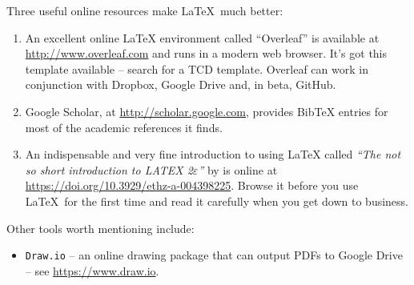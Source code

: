 Three useful online resources make \LaTeX~much better:
\begin{enumerate}[(1)]
\item An excellent online \LaTeX{} environment called ``Overleaf'' is available at \url{http://www.overleaf.com} and runs in a modern web browser. It's got this template available -- search for a TCD template. Overleaf can work in conjunction with Dropbox, Google Drive and, in beta, GitHub.
\item Google Scholar, at \url{http://scholar.google.com}, provides BibTeX entries for most of the academic references it finds.
\item An indispensable and very fine introduction to using \LaTeX{} called \emph{``The not so short introduction to LATEX 2$\varepsilon$''} by \cite{oetiker2001not} is online at \url{https://doi.org/10.3929/ethz-a-004398225}. Browse it before you use \LaTeX~for the first time and  read it carefully when you get down to business.
\end{enumerate}
Other tools worth mentioning include:
\begin{itemize}
\item \texttt{Draw.io} -- an online drawing package that can output PDFs to Google Drive -- see \url{https://www.draw.io}.
\end{itemize}